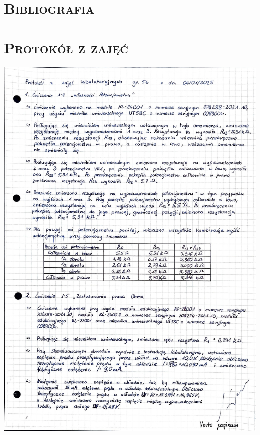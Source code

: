 \documentclass[,a4paper,12pt]{article}
\begin{document}
\section{\textsc{Bibliografia}}
\printbibliography[heading=none]
\section{\textsc{Protokół z zajęć}}\par
    \includegraphics[height=0.95\textheight, width= \linewidth]{Adobe Scan 16 sty 2025 (1)-1.jpg}\newpage
\end{document}
